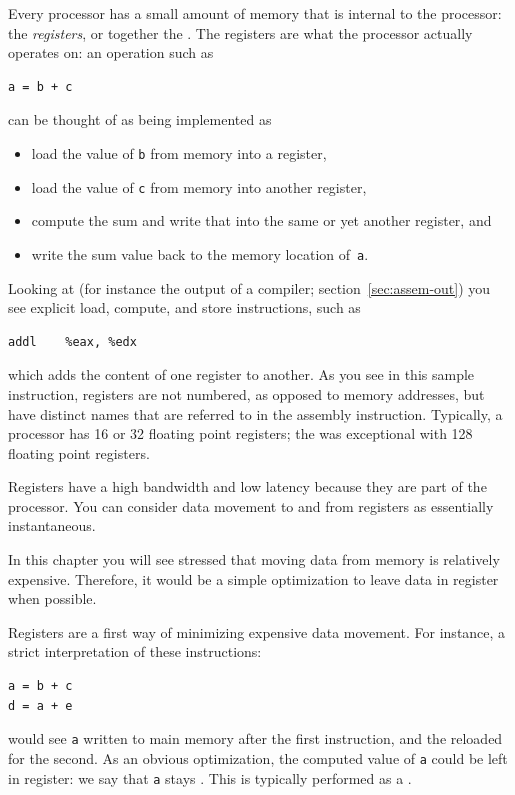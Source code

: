 Every processor has a small amount of memory that is internal to the
processor: the \emph{registers}, or together the
. The registers are what the processor
actually operates on: an operation such as 
\begin{lstlisting}
a = b + c
\end{lstlisting}
can be thought of as being implemented as 
\begin{itemize}
\item load the value of \lstinline{b} from memory into a register,
\item load the value of \lstinline{c} from memory into another register,
\item compute the sum and write that into
  the same or yet another register, and
\item write the sum value back to the memory location of~\lstinline{a}.
\end{itemize}
Looking at 
(for instance the output of a compiler; section~\ref{sec:assem-out})
you see explicit load, compute, and store instructions,
such as
\begin{lstlisting}[language=verbatim]
addl	%eax, %edx
\end{lstlisting}
which adds the content of one register to
another. As you see in this sample instruction, registers are not
numbered, as opposed to memory addresses,
but have distinct names that are referred to in
the assembly instruction. Typically, a processor has 16 or 32
floating point registers; the  was
exceptional with 128 floating point registers.

Registers have a high bandwidth and low latency because they
are part of the processor. You can consider data movement to and from
registers as essentially instantaneous.

In this chapter you will see stressed that moving data from memory is
relatively expensive. Therefore, it would be a simple optimization to
leave data in register when possible.


Registers are a first way of minimizing expensive data movement.
For instance, a strict interpretation of these instructions:
\begin{lstlisting}
a = b + c
d = a + e
\end{lstlisting}
would see \lstinline{a} written to main memory after the first instruction,
and the reloaded for the second.
As an obvious optimization, the computed value of \lstinline{a} could be left in register:
we say that \lstinline{a} stays .
This is typically performed as a
.

